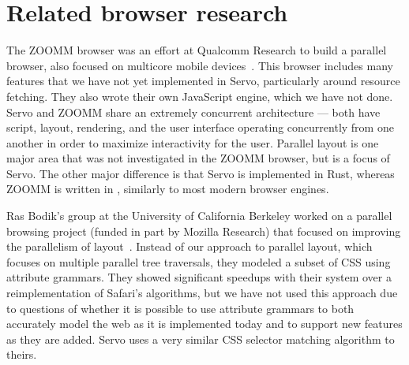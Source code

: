 %
\section{Related browser research}
\label{sec:rel}
The ZOOMM browser was an effort at Qualcomm Research to build a parallel browser, also
focused on multicore mobile devices~\cite{ZOOMM}.
This browser includes many features that we have not yet implemented in Servo, particularly
around resource fetching.
They also wrote their own JavaScript engine, which we have not done.
Servo and ZOOMM share an extremely concurrent architecture --- both have script, layout,
rendering, and the user interface operating concurrently from one another in order to maximize
interactivity for the user.
Parallel layout is one major area that was not investigated in the ZOOMM browser, but is
a focus of Servo.
The other major difference is that Servo is implemented in Rust, whereas ZOOMM is written
in \Cplusplus, similarly to most modern browser engines.

Ras Bodik's group at the University of California Berkeley worked on a parallel browsing
project (funded in part by Mozilla Research) that focused on improving the parallelism
of layout~\cite{parallel-layout}.
Instead of our approach to parallel layout, which focuses on multiple parallel tree
traversals, they modeled a subset of CSS using attribute grammars.
They showed significant speedups with their system over a reimplementation of Safari's
algorithms, but we have not used this approach due to questions of whether it is possible
to use attribute grammars to both accurately model the web as it is implemented today
and to support new features as they are added.
Servo uses a very similar CSS selector matching algorithm to theirs.
